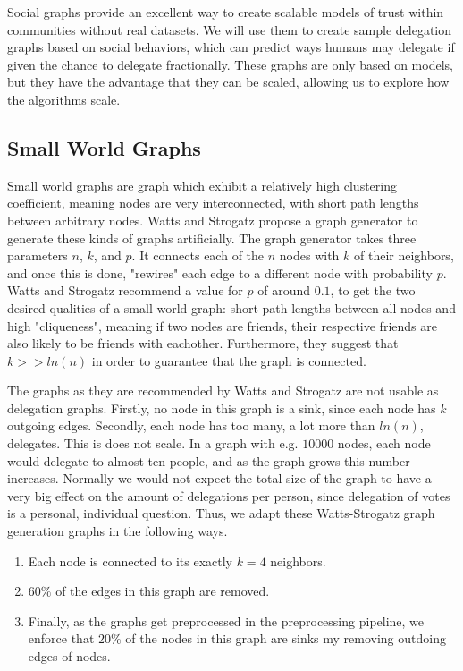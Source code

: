 Social graphs provide an excellent way to create scalable models of trust within communities without real datasets. We will use them to create sample delegation graphs based on social behaviors, which can predict ways humans may delegate if given the chance to delegate fractionally. These graphs are only based on models, but they have the advantage that they can be scaled, allowing us to explore how the algorithms scale.

\subsection{Small World Graphs}

Small world graphs are graph which exhibit a relatively high clustering coefficient, meaning nodes are very interconnected, with short path lengths between arbitrary nodes. Watts and Strogatz propose a graph generator to generate these kinds of graphs artificially. The graph generator takes three parameters $n$, $k$, and $p$. It connects each of the $n$ nodes with $k$ of their neighbors, and once this is done, "rewires" each edge to a different node with probability $p$. Watts and Strogatz recommend a value for $p$ of around $0.1$, to get the two desired qualities of a small world graph: short path lengths between all nodes and high "cliqueness", meaning if two nodes are friends, their respective friends are also likely to be friends with eachother. Furthermore, they suggest that $k >> ln(n)$ in order to guarantee that the graph is connected. \cite{wattsCollectiveDynamicsSmallworld1998} 

The graphs as they are recommended by Watts and Strogatz are not usable as delegation graphs. Firstly, no node in this graph is a sink, since each node has $k$ outgoing edges. Secondly, each node has too many, a lot more than $ln(n)$, delegates. This is does not scale. In a graph with e.g. $10 000$ nodes, each node would delegate to almost ten people, and as the graph grows this number increases. Normally we would not expect the total size of the graph to have a very big effect on the amount of delegations per person, since delegation of votes is a personal, individual question. Thus, we adapt these Watts-Strogatz graph generation graphs in the following ways.

\begin{enumerate}
\item Each node is connected to its exactly $k=4$ neighbors. 
\item $60\%$ of the edges in this graph are removed. 
\item Finally, as the graphs get preprocessed in the preprocessing pipeline, we enforce that $20\%$ of the nodes in this graph are sinks my removing outdoing edges of nodes.  
\end{enumerate}

